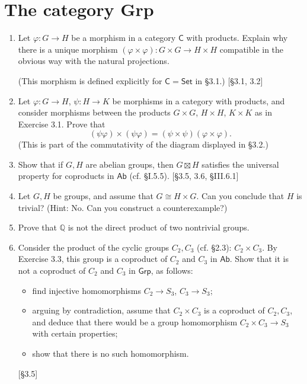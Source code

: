 \section{The category Grp}
\begin{enumerate}
    \item Let $\varphi: G \to H$ be a morphism in a category $\mathsf{C}$ with products. Explain why there is a unique morphism $(\varphi \times \varphi): G \times G \to H \times H$ compatible in the obvious way with the natural projections.

          (This morphism is defined explicitly for $\mathsf{C} = \mathsf{Set}$ in \S3.1.) [\S3.1, 3.2]

    \item Let $\varphi: G \to H$, $\psi: H \to K$ be morphisms in a category with products, and consider morphisms between the products $G \times G$, $H \times H$, $K \times K$ as in Exercise 3.1. Prove that
          \[ (\psi\varphi) \times (\psi\varphi) = (\psi \times \psi)(\varphi \times \varphi). \]
          (This is part of the commutativity of the diagram displayed in \S3.2.)

    \item Show that if $G, H$ are abelian groups, then $G \boxtimes H$ satisfies the universal property for coproducts in $\mathsf{Ab}$ (cf. \S I.5.5). [\S3.5, 3.6, \S III.6.1]

    \item Let $G, H$ be groups, and assume that $G \cong H \times G$. Can you conclude that $H$ is trivial? (Hint: No. Can you construct a counterexample?)

    \item Prove that $\mathbb{Q}$ is not the direct product of two nontrivial groups.

    \item Consider the product of the cyclic groups $C_2, C_3$ (cf. \S2.3): $C_2 \times C_3$. By Exercise 3.3, this group is a coproduct of $C_2$ and $C_3$ in $\mathsf{Ab}$. Show that it is not a coproduct of $C_2$ and $C_3$ in $\mathsf{Grp}$, as follows:
          \begin{itemize}
              \item find injective homomorphisms $C_2 \to S_3$, $C_3 \to S_3$;
              \item arguing by contradiction, assume that $C_2 \times C_3$ is a coproduct of $C_2, C_3$, and deduce that there would be a group homomorphism $C_2 \times C_3 \to S_3$ with certain properties;
              \item show that there is no such homomorphism.
          \end{itemize}
          [\S3.5]


\end{enumerate}
